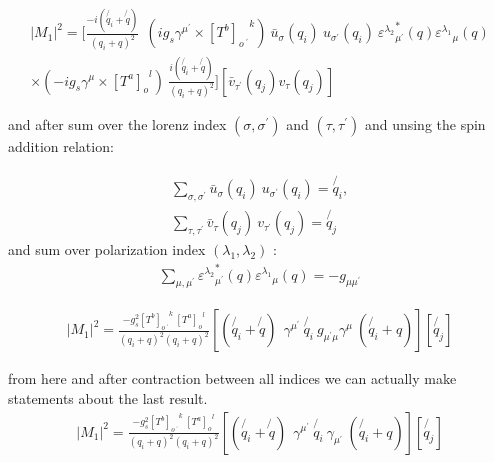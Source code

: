\begin{equation}
\begin{split}
|M_1|^2=[\frac{-i(\not{q_i} + \not{q})}{(q_i + q)^2} \:
 \:  (ig_s \gamma^{{\mu}^{\prime}}\times {[T^b]_{o\:^{\prime}}}^k) \: {\bar{u}}_{\sigma}(q_i)\:u_{{\sigma}^{\prime}}(q_i) \: {{\varepsilon^{\lambda_2}}_{{\mu}^{\prime}}^* (q) {\varepsilon^{\lambda_1}}_{\mu} (q)} \\
\times (-ig_s \gamma^{\mu}\times {[T^a]_o}^l) \: \frac{i(\not{q_i} + \not{q})}{(q_i + q)^2} ]
[{\bar{v}}_{{\tau}^{\prime}}(q_j) {v}_{\tau}(q_j)]
\end{split}
\end{equation}

and after sum over the lorenz index $({\sigma},{\sigma}^{\prime})$ and $({\tau},{\tau}^{\prime})$ and unsing the spin addition relation:
 
\begin{equation}
\begin{split}
\displaystyle\sum\limits_{{\sigma},{\sigma}^{\prime}} {\bar{u}}_{\sigma}(q_i)\:u_{{\sigma}^{\prime}}(q_i) = \not{q_i},\\
\displaystyle\sum\limits_{{\tau},{\tau}^{\prime}} {\bar{v}}_{\tau}(q_j)\:v_{{\tau}^{\prime}}(q_j) = \not{q_j}
\end{split}
\end{equation}
and sum over polarization index $({\lambda_{1}},{\lambda}_{2})$ :
\begin{equation}
\begin{split}
 \displaystyle\sum\limits_{{\mu},{\mu}^{\prime}} {{\varepsilon^{\lambda_2}}_{{\mu}^{\prime}}^* (q) {\varepsilon^{\lambda_1}}_{\mu} (q)} = -g_{{\mu}{\mu}^{\prime}}
\end{split}
\end{equation}

\begin{equation}
\begin{split}
|M_1|^2=\frac{-g_s^2  {[T^b]_{o\:^{\prime}}}^k \: {[T^a]_o}^l }{(q_i + q)^2 (q_i + q)^2}
[(\not{q_i} + \not{q}) \:
 \:  \gamma^{{\mu}^{\prime}} \: \not{q_i} \: g_{{{\mu}^{\prime}}{\mu}} 
\gamma^{\mu} \: (\not{q_i} + q)]
[\not{q_j}]
\end{split}
\end{equation}

from here and after contraction between all indices we can actually make statements about the last result.
\begin{equation}
\begin{split}
|M_1|^2=\frac{-g_s^2  {[T^b]_{o\:^{\prime}}}^k \: {[T^a]_o}^l }{(q_i + q)^2 (q_i + q)^2}
[(\not{q_i} + \not{q}) \:
 \:  \gamma^{{\mu}^{\prime}} \: \not{q_i} \: 
\gamma_{{\mu}^{\prime}} \: (\not{q_i} + q)]
[\not{q_j}]
\end{split}
\end{equation}

